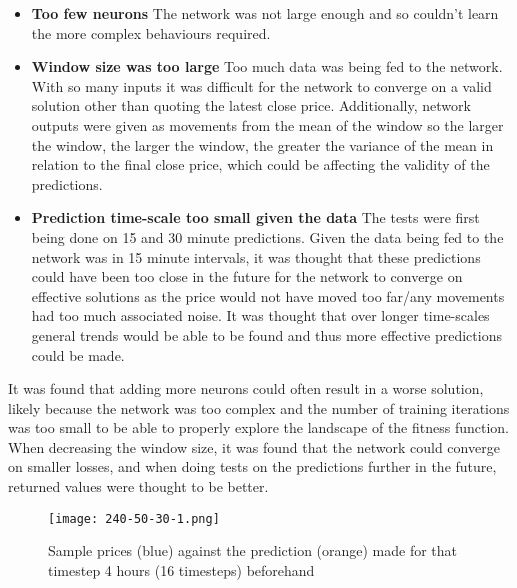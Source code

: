             \begin{itemize}
                \item \textbf{Too few neurons} The network was not large enough and so couldn't learn the more complex behaviours required.
                
                \item \textbf{Window size was too large} Too much data was being fed to the network. With so many inputs it was difficult for the network to converge on a valid solution other than quoting the latest close price. Additionally, network outputs were given as movements from the mean of the window so the larger the window, the larger the window, the greater the variance of the mean in relation to the final close price, which could be affecting the validity of the predictions. 
                
                \item \textbf{Prediction time-scale too small given the data} The tests were first being done on 15 and 30 minute predictions. Given the data being fed to the network was in 15 minute intervals, it was thought that these predictions could have been too close in the future for the network to converge on effective solutions as the price would not have moved too far/any movements had too much associated noise. It was thought that over longer time-scales general trends would be able to be found and thus more effective predictions could be made.
            
            \end{itemize}
            

            It was found that adding more neurons could often result in a worse solution, likely because the network was too complex and the number of training iterations was too small to be able to properly explore the landscape of the fitness function. When decreasing the window size, it was found that the network could converge on smaller losses, and when doing tests on the predictions further in the future, returned values were thought to be better.

            \begin{figure}[h]
                \centering
                \texttt{[image: 240-50-30-1.png]}
                \caption{Sample prices (blue) against the prediction (orange) made for that timestep 4 hours (16 timesteps) beforehand}
                \label{fig:240_predictions}
            \end{figure}

